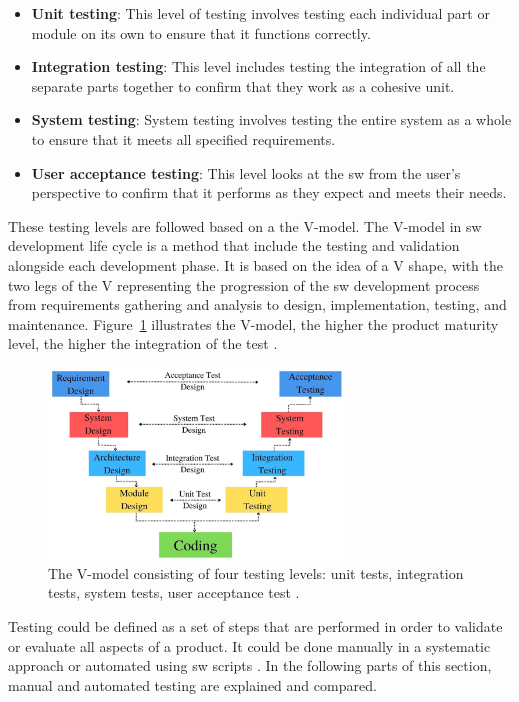 \begin{itemize}
    \item \textbf{Unit testing}: This level of testing involves testing each individual part or module on its own to ensure that it functions correctly.
    \item \textbf{Integration testing}: This level includes testing the integration of all the separate parts together to confirm that they work as a cohesive unit.
    \item \textbf{System testing}: System testing involves testing the entire system as a whole to ensure that it meets all specified requirements.
    \item \textbf{User acceptance testing}: This level looks at the \gls{sw} from the user's perspective to confirm that it performs as they expect and meets their needs.
\end{itemize}

These testing levels are followed based on a the V-model. The V-model in \gls{sw} development life cycle is a method that include the testing and validation alongside each development phase. It is based on the idea of a V shape, with the two legs of the V representing the progression of the \gls{sw} development process from requirements gathering and analysis to design, implementation, testing, and maintenance. Figure~\ref{V-model} illustrates the V-model, the higher the product maturity level, the higher the integration of the test \cite{leloudas2023}.

\begin{figure}[!ht]
    \centering
    \includegraphics[width=0.7\textwidth]{Figures/V-model.jpg}  %
    \caption{The V-model consisting of four testing levels: unit tests, integration tests, system tests, user acceptance test \cite{V_model}.}
    \label{V-model}
\end{figure}

Testing could be defined as a set of steps that are performed in order to validate or evaluate all aspects of a product. It could be done manually in a systematic approach or automated using \gls{sw} scripts \cite{shiwangi2014}. In the following parts of this section, manual and automated testing are explained and compared.


